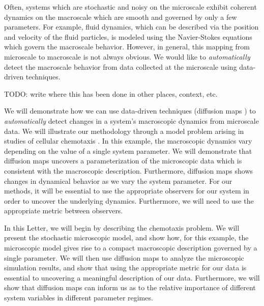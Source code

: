 \documentclass[prl, reprint, final, showkeys]{revtex4-1}
\begin{document}

\maketitle

 
Often, systems which are stochastic and noisy on the microscale exhibit coherent dynamics on the macroscale which are smooth and governed by only a few parameters.
%
For example, fluid dynamics, which can be described via the position and velocity of the fluid particles, is modeled using the Navier-Stokes equations which govern the macroscale behavior. 
%
However, in general, this mapping from microscale to macroscale is not always obvious.
%
We would like to {\em automatically} detect the macroscale behavior from data collected at the microscale using data-driven techniques.

TODO: write where this has been done in other places, context, etc.

We will demonstrate how we can use data-driven techniques (diffusion maps \cite{coifman2005geometric}) to {\em automatically} detect changes in a system's macroscopic dynamics from microscale data.
%
We will illustrate our methodology through a model problem arising in studies of cellular chemotaxis \cite{othmer2000diffusion}.
%
In this example, the macroscopic dynamics vary depending on the value of a single system parameter.
%
We will demonstrate that diffusion maps uncovers a parameterization of the microscopic data which is consistent with the macroscopic description.
%
Furthermore, diffusion maps shows changes in dynamical behavior as we vary the system parameter. 
%
For our methods, it will be essential to use the appropriate observers for our system in order to uncover the underlying dynamics.
%
Furthermore, we will need to use the appropriate metric between observers.

In this Letter, we will begin by describing the chemotaxis problem.
%
We will present the stochastic microscopic model, and show how, for this example, the microscopic model gives rise to a compact macroscopic description governed by a single parameter.
%
We will then use diffusion maps to analyze the microscopic simulation results, and show that using the appropriate metric for our data is essential to uncovering a meaningful description of our data.
%
Furthermore, we will show that diffusion maps can inform us as to the relative importance of different system variables in different parameter regimes.
\end{document}
